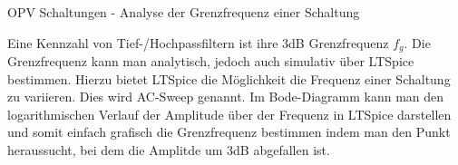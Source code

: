        \begin{frame}[t]{OPV Schaltungen - Analyse der Grenzfrequenz einer Schaltung }

        \begin{spacing}{0.6} \begin{tiny}
        Eine Kennzahl von Tief-/Hochpassfiltern ist ihre 3dB Grenzfrequenz $f_g$. Die Grenzfrequenz kann man analytisch, jedoch auch simulativ
        über LTSpice bestimmen. Hierzu bietet LTSpice die Möglichkeit die Frequenz einer Schaltung zu variieren. Dies wird AC-Sweep genannt. 
        Im Bode-Diagramm kann man den logarithmischen Verlauf der Amplitude über der Frequenz in LTSpice darstellen und 
        somit einfach grafisch die Grenzfrequenz bestimmen indem man den Punkt heraussucht, bei dem die Amplitde um 3dB abgefallen ist.
        \end{tiny} \end{spacing}
  

\end{frame}
